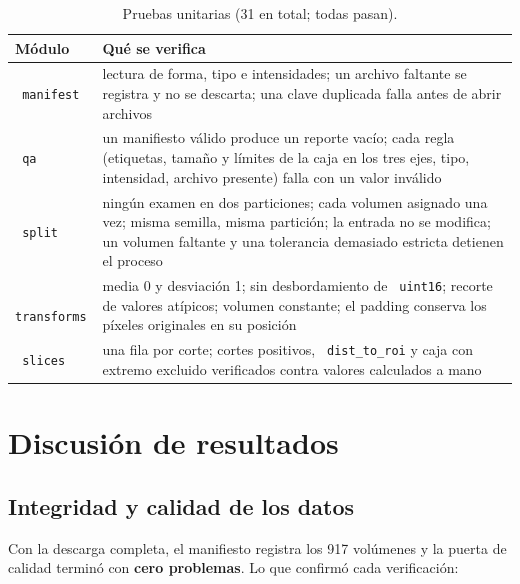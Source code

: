 \documentclass[12pt,letterpaper]{article}
\newcommand{\code}[1]{\texttt{\hyphenchar\font=-1 #1}}
\begin{document}
\begin{table}[!htbp]
\centering
\small
\caption{Pruebas unitarias (31 en total; todas pasan).}
\label{tab:tests}
\begin{tabular}{p{3.0cm}p{11.2cm}}
\toprule
Módulo & Qué se verifica \\
\midrule
\code{manifest} & lectura de forma, tipo e intensidades; un archivo faltante se registra y no se descarta; una clave duplicada falla antes de abrir archivos \\
\code{qa} & un manifiesto válido produce un reporte vacío; cada regla (etiquetas, tamaño y límites de la caja en los tres ejes, tipo, intensidad, archivo presente) falla con un valor inválido \\
\code{split} & ningún examen en dos particiones; cada volumen asignado una vez; misma semilla, misma partición; la entrada no se modifica; un volumen faltante y una tolerancia demasiado estricta detienen el proceso \\
\code{transforms} & media 0 y desviación 1; sin desbordamiento de \code{uint16}; recorte de valores atípicos; volumen constante; el padding conserva los píxeles originales en su posición \\
\code{slices} & una fila por corte; cortes positivos, \code{dist\_to\_roi} y caja con extremo excluido verificados contra valores calculados a mano \\
\bottomrule
\end{tabular}
\end{table}

\section{Discusión de resultados}\label{sec:discusion}

\subsection{Integridad y calidad de los datos}

Con la descarga completa, el manifiesto registra los 917 volúmenes y la puerta de calidad terminó con \textbf{cero problemas}. Lo que confirmó cada verificación:
\end{document}
